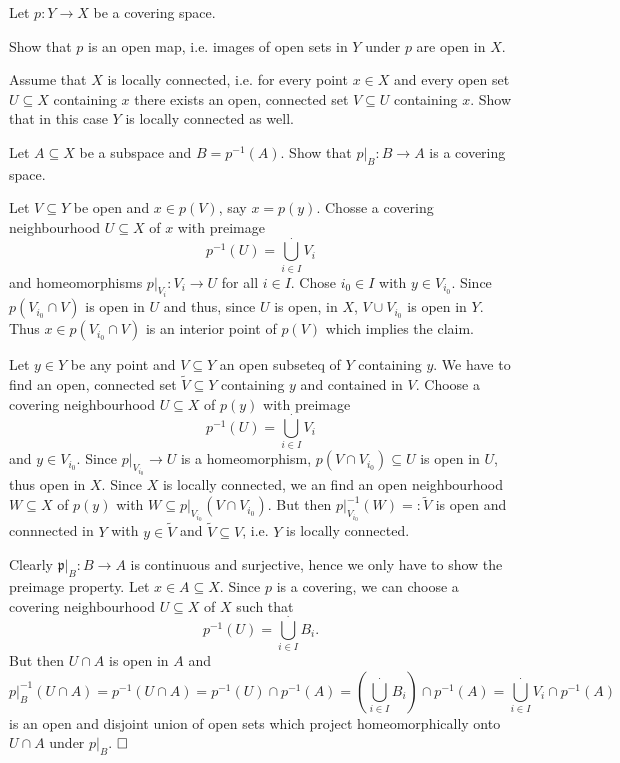 \documentclass[11pt]{book}
\numberwithin{dummy}{section}
\theoremstyle{nonumberbreak}
\newenvironment{sol}[1][]{\ifthenelse{\equal{#1}{}}{\solution}{\solution[#1]}\rm}{\endsolution}
\newenvironment{prob}[1][]{\ifthenelse{\equal{#1}{}}{\problem}{\problem[#1]}\rm}{\endproblem}
\newcommand{\p}{\mathfrak{p}}
\newcommand{\la}{\longrightarrow}
\begin{document}
\begin{spacing}{1.4}
\begin{prob}
\end{prob}


\begin{prob}   %
Let $p: Y \la X$ be a covering space.
\begin{compactenum}
\item Show that $p$ is an open map, i.e. images of open sets in $Y$ under $p$ are open in $X$.
\item Assume that $X$ is locally connected, i.e. for every point $x \in X$ and every open set $U \subseteq X$ containing $x$ there exists an open, connected set $V \subseteq U$ containing $x$. Show that in this case $Y$ is locally connected as well.
\item Let $A \subseteq X$ be a subspace and $B= p^{-1}(A)$. Show that $p\vert_B: B \la A$ is a covering space.
\end{compactenum}
\begin{sol}
\begin{compactenum}
\item Let $V \subseteq Y$ be open and $x \in p(V)$, say $x= p(y)$. Chosse a covering neighbourhood $U \subseteq X$ of $x$ with preimage 
$$p^{-1}(U) = \bigcup^{\cdot}_{i \in I} V_i$$
and homeomorphisms $p\vert_{V_i}: V_i \la U$ for all $i \in I$. Chose $i_0 \in I$ with $y \in V_{i_0}$. Since $p(V_{i_0} \cap V)$ is open in $U$ and thus, since $U$ is open, in $X$, $V \cup V_{i_0}$ is open in $Y$. Thus $x \in p(V_{i_0}\cap V)$ is an interior point of $p(V)$ which implies the claim.
\item Let $y \in Y$ be any point and $V \subseteq Y$ an open subseteq of $Y$ containing $y$. We have to find an open, connected set $\tilde{V} \subseteq Y$ containing $y$ and contained in $V$. Choose a covering neighbourhood $U\subseteq X$ of $p(y)$ with preimage 
$$p^{-1}(U) = \bigcup^{\cdot}_{i \in I} V_i$$
and $y \in V_{i_0}$. Since $p\vert_{V_{i_0}} \la U$ is a homeomorphism, $p(V \cap V_{i_0}) \subseteq U$ is open in $U$, thus open in $X$. Since $X$ is locally connected, we an find an open neighbourhood $W\subseteq X$ of $p(y)$ with $W \subseteq p\vert_{V_{i_0}}(V \cap V_{i_0})$. But then $p\vert_{V_{i_0}}^{-1}(W) =: \tilde{V}$ is open and connnected in $Y$ with $y \in \tilde{V}$ and $\tilde{V} \subseteq V$, i.e. $Y$ is locally connected.
\item Clearly $\p\vert_{B}: B \la A$ is continuous and surjective, hence we only have to show the preimage property. Let $x \in A \subseteq X$. Since $p$ is a covering, we can choose a covering neighbourhood $U \subseteq X$ of $X$  such that 
$$p^{-1}(U) = \bigcup_{i \in I}^{\cdot} B_i.$$
But then $U \cap A$ is open in $A$ and 
$$p\vert_B ^{-1}(U \cap A) = p^{-1}(U \cap A) = p^{-1}(U) \cap p^{-1}(A) = \left( \bigcup_{i\in I}^{\cdot} B_i\right) \cap p^{-1}(A) = \bigcup_{i \in I}^{\cdot} V_i \cap p^{-1}(A)$$
is an open and disjoint union of open sets which project homeomorphically onto $U \cap A$ under $p\vert_{B}$. $\hfill \Box$


\end{compactenum}
\end{sol}
\end{prob}
\end{spacing}
\end{document}
